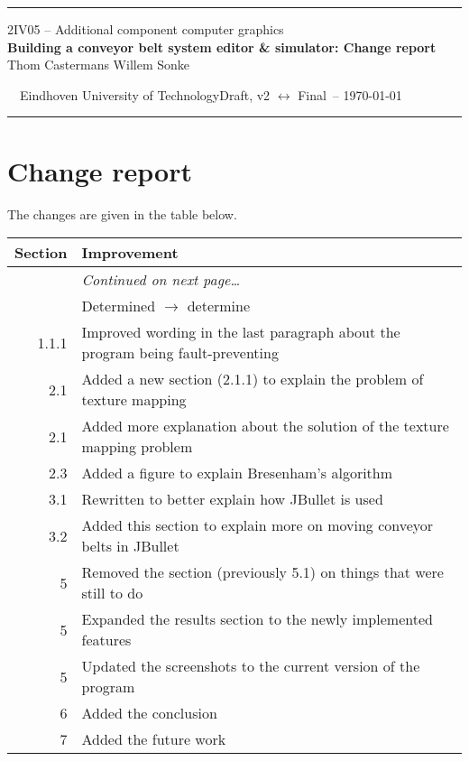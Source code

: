 \documentclass[a4paper,10pt]{article}
\newcommand*{\accgtitle}{Building a conveyor belt system editor \& simulator: Change report\xspace}
\newcommand*{\accgversion}{Draft, v2 $\leftrightarrow$ Final\xspace}
\begin{document}
\begin{adjustwidth}{0.05\textwidth}{0.05\textwidth}  
  \textcolor{accgblue}{\rule{0.9\textwidth}{0.8pt}}
  
  \begin{center}
    \large 2IV05 -- Additional component computer graphics\\
    \Large\textbf{\accgtitle}\\[10pt]
    \normalsize Thom Castermans \qquad Willem Sonke
  \end{center}
  
  \vspace{10pt}\noindent\footnotesize~~Eindhoven University of Technology\hfill\accgversion\ -- \today~~
  
  \vspace{-6pt}\noindent\textcolor{accgblue}{\rule{0.9\textwidth}{0.8pt}}
\end{adjustwidth}

\begin{abstract}
 This document details the changes between the second draft version of the report (version ``Draft, v2'' of 14 March 2014) and the final version (version ``Final'' of 22 April 2014).
\end{abstract}

\section*{Change report}
The changes are given in the table below.

\begin{longtabu}{r>{\raggedright}X<{\strut}}
  \toprule
  \textbf{Section} & \textbf{Improvement} \\
  \midrule
  \endhead
  \bottomrule
  & \vspace*{-5pt}\hfill\textit{Continued on next page\ldots} \\
  \endfoot
  \bottomrule
   & Determined $\rightarrow$ determine \\
  1.1.1 & Improved wording in the last paragraph about the program being fault-preventing \\
  2.1 & Added a new section (2.1.1) to explain the problem of texture mapping \\
  2.1 & Added more explanation about the solution of the texture mapping problem \\
  2.3 & Added a figure to explain Bresenham's algorithm \\
  3.1 & Rewritten to better explain how JBullet is used \\
  3.2 & Added this section to explain more on moving conveyor belts in JBullet \\
  5 & Removed the section (previously 5.1) on things that were still to do \\
  5 & Expanded the results section to the newly implemented features \\
  5 & Updated the screenshots to the current version of the program \\
  6 & Added the conclusion \\
  7 & Added the future work \\
\end{longtabu}
\end{document}
